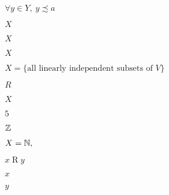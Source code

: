 \documentclass[10pt]{book}
\begin{document}
\begin{mdSnippets}
\begin{mdInlineSnippet}%
$\forall y \in Y,\ y \precsim a$\end{mdInlineSnippet}%
\begin{mdInlineSnippet}[02129bb861061d1a052c592e2dc6b383]%
$X$\end{mdInlineSnippet}%
\begin{mdInlineSnippet}[02129bb861061d1a052c592e2dc6b383]%
$X$\end{mdInlineSnippet}%
\begin{mdInlineSnippet}[02129bb861061d1a052c592e2dc6b383]%
$X$\end{mdInlineSnippet}%
\begin{mdInlineSnippet}[7941e6f4a6c48fb3cee1cd3345e9d57b]%
$X = \{\text{all linearly independent subsets of }V\}$\end{mdInlineSnippet}%
\begin{mdInlineSnippet}[e1e1d3d40573127e9ee0480caf1283d6]%
$R$\end{mdInlineSnippet}%
\begin{mdInlineSnippet}[02129bb861061d1a052c592e2dc6b383]%
$X$\end{mdInlineSnippet}%
\begin{mdInlineSnippet}[e4da3b7fbbce2345d7772b0674a318d5]%
$5$\end{mdInlineSnippet}%
\begin{mdInlineSnippet}[1458a437b3c6456f9ebf61d46c9ed13e]%
$\mathbb{Z}$\end{mdInlineSnippet}%
\begin{mdInlineSnippet}%
$X = \mathbb{N},$\end{mdInlineSnippet}%
\begin{mdInlineSnippet}[931afb0394b8723c145d0a713387ae84]%
$x \mathrel{R} y$\end{mdInlineSnippet}%
\begin{mdInlineSnippet}[9dd4e461268c8034f5c8564e155c67a6]%
$x$\end{mdInlineSnippet}%
\begin{mdInlineSnippet}[415290769594460e2e485922904f345d]%
$y$\end{mdInlineSnippet}%

\end{mdSnippets}
\end{document}
